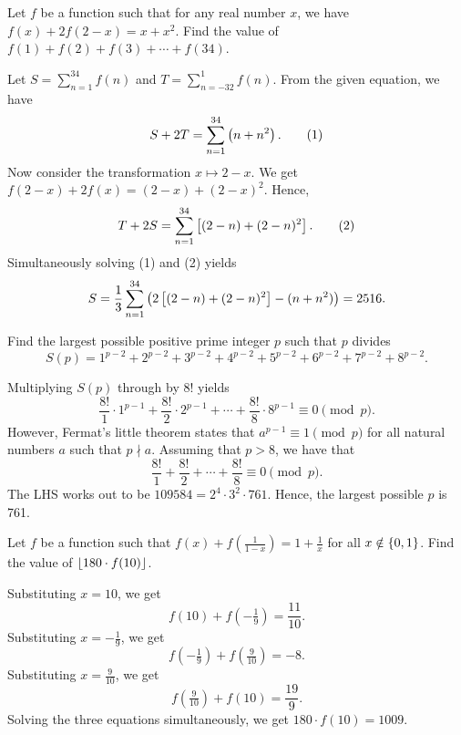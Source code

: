 \begin{question}[2516]\label{A::2024-O-1-18}
    Let $f$ be a function such that for any real number $x$, we have $f(x) + 2f(2-x) = x + x^2$. Find the value of $f(1) + f(2) + f(3) + \cdots + f(34)$.
\end{question}
\begin{solution*}
    Let $S = \sum_{n=1}^{34} f(n)$ and $T = \sum_{n=-32}^1 f(n)$. From the given equation, we have \[S + 2T = \sum_{n=1}^{34} \left( n + n^2 \right). \tag{1}\] Now consider the transformation $x \mapsto 2-x$. We get $f(2-x) + 2f(x) = (2-x) + (2-x)^2$. Hence, \[T + 2S = \sum_{n=1}^{34} \left[ (2-n) + (2-n)^2 \right]. \tag{2}\] Simultaneously solving (1) and (2) yields \[S = \frac13 \sum_{n=1}^{34} \left( 2\left[ (2-n) + (2-n)^2 \right] - (n + n^2) \right) = 2516.\]
\end{solution*}

\begin{question}[761]\label{A::2024-O-1-19}
    Find the largest possible positive prime integer $p$ such that $p$ divides \[S(p) = 1^{p-2} + 2^{p-2} + 3^{p-2} + 4^{p-2} + 5^{p-2} + 6^{p-2} + 7^{p-2} + 8^{p-2}.\]
\end{question}
\begin{solution*}
    Multiplying $S(p)$ through by $8!$ yields \[\frac{8!}{1} \cdot 1^{p-1} + \frac{8!}{2} \cdot 2^{p-1} + \cdots + \frac{8!}{8} \cdot 8^{p-1}\equiv 0 \pmod{p}.\] However, Fermat's little theorem states that $a^{p-1} \equiv 1 \pmod{p}$ for all natural numbers $a$ such that $p \nmid a$. Assuming that $p > 8$, we have that \[\frac{8!}{1} + \frac{8!}{2} + \cdots + \frac{8!}{8} \equiv 0 \pmod{p}.\] The LHS works out to be $109584 = 2^4 \cdot 3^2 \cdot 761$. Hence, the largest possible $p$ is 761.
\end{solution*}

\begin{question}[1009]\label{A::2024-O-1-20}
    Let $f$ be a function such that $f(x) + f(\frac{1}{1-x}) = 1 + \frac1x$ for all $x \notin \left\lbrace 0, 1 \right\rbrace$. Find the value of $\left\lfloor 180 \cdot f(10) \right\rfloor$.
\end{question}
\begin{solution*}
    Substituting $x = 10$, we get \[f(10) + f(-\tfrac19) = \frac{11}{10}.\] Substituting $x = -\frac19$, we get \[f(-\tfrac19) + f(\tfrac9{10}) = -8.\] Substituting $x = \frac9{10}$, we get \[f(\tfrac9{10}) + f(10) = \frac{19}9.\] Solving the three equations simultaneously, we get $180 \cdot f(10) = 1009$.
\end{solution*}

